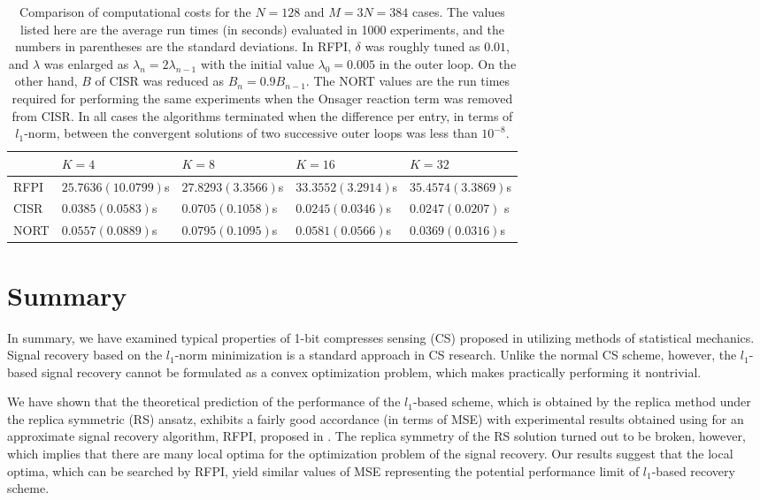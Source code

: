 \documentclass[12pt]{iopart}
\begin{document}
\begin{table}
\protect
\caption{\protect\label{table1} Comparison of computational costs for the $N=128$ and $M=3N=384$ cases. The values listed here are the average run times (in seconds) evaluated in 1000 experiments, and the numbers in parentheses are the standard deviations. In RFPI, $\delta$ was roughly tuned as $0.01$, and $\lambda$ was enlarged as $\lambda_n=2 \lambda_{n-1}$ with the initial value $\lambda_0=0.005$ in the outer loop. On the other hand, $B$ of CISR was reduced as $B_n = 0.9 B_{n-1}$. The NORT values are %
the run times required for performing the same experiments when the Onsager reaction term was removed from CISR. In all cases the algorithms terminated when the difference per entry, in terms of $l_1$-norm, between the convergent solutions of two successive outer loops was less than $10^{-8}$.}
\begin{center}
\begin{tabular}{|l|l|l|l|l|}
\hline 
& $K=4$ & $K=8$ & $K=16$ & $K=32$\\ \hline 
RFPI & $25.7636 (10.0799) $s & $27.8293 (3.3566)  $s & $33.3552 (3.2914) $s & $35.4574 (3.3869)$s \\
CISR & $0.0385 (0.0583) $s & $0.0705 (0.1058)  $s & $0.0245 (0.0346) $s & $0.0247 (0.0207)$ s\\
NORT & $0.0557 (0.0889) $s & $0.0795 (0.1095)  $s & $0.0581 (0.0566) $s & $0.0369 (0.0316) $s \\ 
\hline
\end{tabular}
\end{center}
\end{table}

\section{Summary}
In summary, we have examined typical properties of 1-bit compresses sensing (CS) proposed in \cite{1bitCS} utilizing methods of statistical mechanics. Signal recovery based on the $l_1$-norm minimization is a standard approach in CS research. Unlike the normal CS scheme, however, the $l_1$-based signal recovery cannot be formulated as a convex optimization problem, which makes practically performing it nontrivial. 

We have shown that the theoretical prediction of the performance of the $l_1$-based scheme, which is obtained by the replica method under the replica symmetric (RS) ansatz, exhibits a fairly good accordance (in terms of MSE) with experimental results obtained using for an approximate signal recovery algorithm, RFPI, proposed in \cite{1bitCS}. The replica symmetry of the RS solution turned out to be broken, however, which implies that there are many local optima for the optimization problem of the signal recovery. 
Our results suggest that the local optima, 
which can be searched by RFPI, yield similar values of MSE representing 
the potential performance limit of $l_1$-based recovery scheme.
\end{document}

